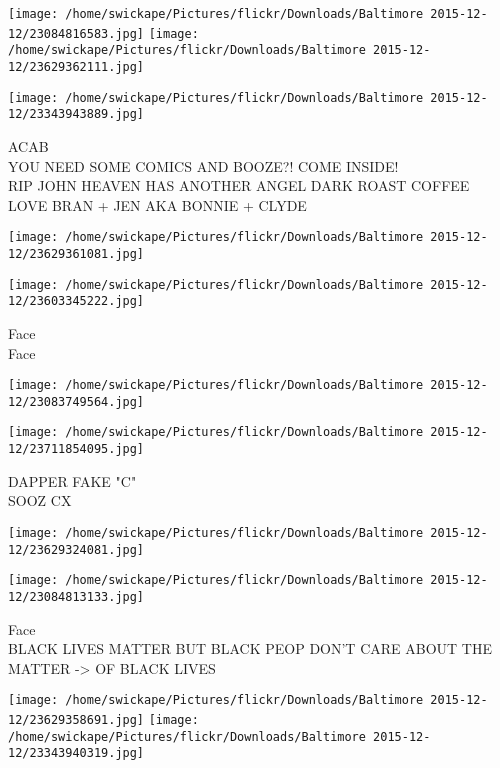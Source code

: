 \documentclass[10pt,letterpaper]{article}
\begin{document}
\texttt{[image: /home/swickape/Pictures/flickr/Downloads/Baltimore 2015-12-12/23084816583.jpg]}
\texttt{[image: /home/swickape/Pictures/flickr/Downloads/Baltimore 2015-12-12/23629362111.jpg]}

\vspace{0.25in}
\texttt{[image: /home/swickape/Pictures/flickr/Downloads/Baltimore 2015-12-12/23343943889.jpg]}

ACAB\\
YOU NEED SOME COMICS AND BOOZE?!  COME INSIDE!\\
RIP JOHN HEAVEN HAS ANOTHER ANGEL DARK ROAST COFFEE LOVE BRAN + JEN AKA BONNIE + CLYDE\\
\pagebreak

\texttt{[image: /home/swickape/Pictures/flickr/Downloads/Baltimore 2015-12-12/23629361081.jpg]}

\vspace{0.25in}
\texttt{[image: /home/swickape/Pictures/flickr/Downloads/Baltimore 2015-12-12/23603345222.jpg]}

Face\\
Face\\
\pagebreak

\texttt{[image: /home/swickape/Pictures/flickr/Downloads/Baltimore 2015-12-12/23083749564.jpg]}

\vspace{0.25in}
\texttt{[image: /home/swickape/Pictures/flickr/Downloads/Baltimore 2015-12-12/23711854095.jpg]}

DAPPER FAKE "C"\\
SOOZ CX\\
\pagebreak

\texttt{[image: /home/swickape/Pictures/flickr/Downloads/Baltimore 2015-12-12/23629324081.jpg]}

\vspace{0.25in}
\texttt{[image: /home/swickape/Pictures/flickr/Downloads/Baltimore 2015-12-12/23084813133.jpg]}

Face\\
BLACK LIVES MATTER BUT BLACK PEOP DON'T CARE ABOUT THE MATTER {-}> OF BLACK LIVES\\
\pagebreak

\texttt{[image: /home/swickape/Pictures/flickr/Downloads/Baltimore 2015-12-12/23629358691.jpg]}
\texttt{[image: /home/swickape/Pictures/flickr/Downloads/Baltimore 2015-12-12/23343940319.jpg]}
\end{document}
